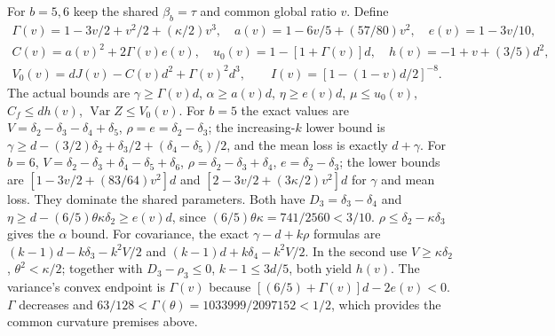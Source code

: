 For $b=5,6$ keep the shared $\beta_b=\tau$ and common global ratio
$v$. Define
\begin{equation}\tag{L58.14.1}\label{eq:L58:middleparameters}
\begin{gathered}
\Gamma(v)=1-3v/2+v^2/2+(\kappa/2)v^3,\quad
a(v)=1-6v/5+(57/80)v^2,\quad e(v)=1-3v/10,\\
C(v)=a(v)^2+2\Gamma(v)e(v),\quad u_0(v)=1-[1+\Gamma(v)]d,
\quad h(v)=-1+v+(3/5)d^2,\\
V_0(v)=dJ(v)-C(v)d^2+\Gamma(v)^2d^3,
\qquad I(v)=[1-(1-v)d/2]^{-8}.
\end{gathered}
\end{equation}
The actual bounds are $\gamma\ge\Gamma(v)d$,
$\alpha\ge a(v)d$, $\eta\ge e(v)d$,
$\mu\le u_0(v)$, $C_f\le dh(v)$, $\operatorname{Var}Z\le V_0(v)$.
For $b=5$ the exact values are
$V=\delta_2-\delta_3-\delta_4+\delta_5$,
$\rho=e=\delta_2-\delta_3$; the increasing-$k$ lower bound is
$\gamma\ge d-(3/2)\delta_2+\delta_3/2+(\delta_4-\delta_5)/2$,
and the mean loss is exactly $d+\gamma$.
For $b=6$, $V=\delta_2-\delta_3+\delta_4-\delta_5+\delta_6$,
$\rho=\delta_2-\delta_3+\delta_4$, $e=\delta_2-\delta_3$;
the lower bounds are $[1-3v/2+(83/64)v^2]d$ and
$[2-3v/2+(3\kappa/2)v^2]d$ for $\gamma$ and mean loss.
They dominate the shared parameters.
Both have $D_3=\delta_3-\delta_4$ and
$\eta\ge d-(6/5)\theta\kappa\delta_2\ge e(v)d$,
since $(6/5)\theta\kappa=741/2560<3/10$.
$\rho\le\delta_2-\kappa\delta_3$ gives the $\alpha$ bound.
For covariance, the exact $\gamma-d+k\rho$ formulas are
$(k-1)d-k\delta_3-k^2V/2$ and
$(k-1)d+k\delta_4-k^2V/2$.
In the second use $V\ge\kappa\delta_2$,
$\theta^2<\kappa/2$; together with $D_3-\rho_3\le0$,
$k-1\le3d/5$, both yield $h(v)$.
The variance's convex endpoint is $\Gamma(v)$ because
$[(6/5)+\Gamma(v)]d-2e(v)<0$.
$\Gamma$ decreases and
$63/128<\Gamma(\theta)=1033999/2097152<1/2$,
which provides the common curvature premises above.


